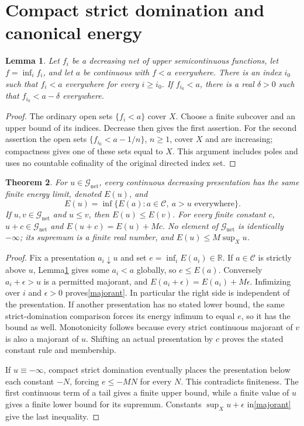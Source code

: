 \documentclass[11pt]{article}
\newcommand{\C}{\mathcal C}
\newcommand{\GN}{\mathcal G_{\mathrm{net}}}
\newcommand{\RR}{\mathbb R}
\newtheorem{theorem}{Theorem}
\newtheorem{lemma}[theorem]{Lemma}
\theoremstyle{remark}\newtheorem{remark}[theorem]{Remark}
\begin{document}
\section{Compact strict domination and canonical energy}
\begin{lemma}\label{strict}
Let $f_i$ be a decreasing net of upper semicontinuous functions,
let $f=\inf_i f_i$, and let $a$ be continuous with $f<a$ everywhere.
There is an index $i_0$ such that $f_i<a$ everywhere for every
$i\ge i_0$. If $f_{i_0}<a$, there is a real $\delta>0$ such that
$f_{i_0}<a-\delta$ everywhere.
\end{lemma}
\begin{proof}
The ordinary open sets $\{f_i<a\}$ cover $X$. Choose a finite
subcover and an upper bound of its indices. Decrease then gives
the first assertion. For the second assertion the open sets
$\{f_{i_0}<a-1/n\}$, $n\ge1$, cover $X$ and are increasing;
compactness gives one of these sets equal to $X$.
This argument includes poles and uses no countable cofinality
of the original directed index set.
\end{proof}

\begin{theorem}\label{canonical}
For $u\in\GN$, every continuous decreasing presentation has the
same finite energy limit, denoted $E(u)$, and
\begin{equation}\label{majorant}
 E(u)=\inf\{E(a):a\in\C,\ a>u\text{ everywhere}\}.
\end{equation}
If $u,v\in\GN$ and $u\le v$, then $E(u)\le E(v)$.
For every finite constant $c$, $u+c\in\GN$ and
$E(u+c)=E(u)+Mc$.
No element of $\GN$ is identically $-\infty$; its supremum is a
finite real number, and $E(u)\le M\sup_Xu$.
\end{theorem}
\begin{proof}
Fix a presentation $a_i\downarrow u$ and set
$e=\inf_iE(a_i)\in\RR$. If $a\in\C$ is strictly above $u$,
Lemma\ref{strict} gives some $a_i<a$ globally, so $e\le E(a)$.
Conversely $a_i+\epsilon>u$ is a permitted majorant, and
$E(a_i+\epsilon)=E(a_i)+M\epsilon$. Infimizing over $i$ and
$\epsilon>0$ proves\eqref{majorant}. In particular the right side
is independent of the presentation. If another presentation has
no stated lower bound, the same strict-domination comparison
forces its energy infimum to equal $e$, so it has the bound as well.
Monotonicity follows because every strict continuous majorant of
$v$ is also a majorant of $u$.
Shifting an actual presentation by $c$ proves the stated constant
rule and membership.

If $u\equiv-\infty$, compact strict domination eventually places
the presentation below each constant $-N$, forcing $e\le-MN$ for
every $N$. This contradicts finiteness. The first continuous term
of a tail gives a finite upper bound, while a finite value of $u$
gives a finite lower bound for its supremum. Constants
$\sup_Xu+\epsilon$ in\eqref{majorant} give the last inequality.
\end{proof}
\end{document}
